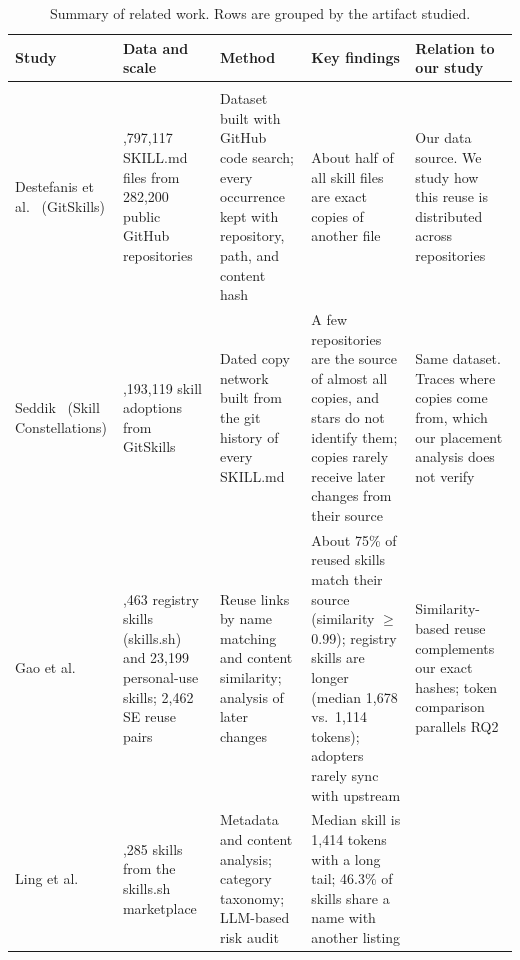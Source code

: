 \begin{table}[t]
  \caption{Summary of related work. Rows are grouped by the artifact studied.}
  \label{tab:related-work}
  \footnotesize
  \renewcommand{\arraystretch}{1.15}
  \begin{tabularx}{\textwidth}{@{}
      >{\raggedright\arraybackslash}p{2.35cm}
      >{\raggedright\arraybackslash}p{2.5cm}
      >{\raggedright\arraybackslash}X
      >{\raggedright\arraybackslash}X
      >{\raggedright\arraybackslash}X@{}}
    \toprule
    \textbf{Study} & \textbf{Data and scale} & \textbf{Method} & \textbf{Key findings} & \textbf{Relation to our study} \\
    \midrule
    \multicolumn{5}{@{}l}{\textit{Agent skills (SKILL.md)}} \\
    \addlinespace[2pt]
    Destefanis et al.~\cite{destefanis2026gitskills} (GitSkills)
      & 3,797,117 SKILL.md files from 282,200 public GitHub repositories
      & Dataset built with GitHub code search; every occurrence kept with repository, path, and content hash
      & About half of all skill files are exact copies of another file
      & Our data source. We study how this reuse is distributed across repositories \\
    \addlinespace[3pt]
    Seddik~\cite{seddik2026constellations} (Skill Constellations)
      & 2,193,119 skill adoptions from GitSkills
      & Dated copy network built from the git history of every SKILL.md
      & A few repositories are the source of almost all copies, and stars do not identify them; copies rarely receive later changes from their source
      & Same dataset. Traces where copies come from, which our placement analysis does not verify \\
    \addlinespace[3pt]
    Gao et al.~\cite{gao2026registry}
      & 18,463 registry skills (skills.sh) and 23,199 personal-use skills; 2,462 SE reuse pairs
      & Reuse links by name matching and content similarity; analysis of later changes
      & About 75\% of reused skills match their source (similarity $\geq$ 0.99); registry skills are longer (median 1,678 vs.\ 1,114 tokens); adopters rarely sync with upstream
      & Similarity-based reuse complements our exact hashes; token comparison parallels RQ2 \\
    \addlinespace[3pt]
    Ling et al.~\cite{ling2026agentskills}
      & 40,285 skills from the skills.sh marketplace
      & Metadata and content analysis; category taxonomy; LLM-based risk audit
      & Median skill is 1,414 tokens with a long tail; 46.3\% of skills share a name with another listing

\end{tabularx}
\end{table}
